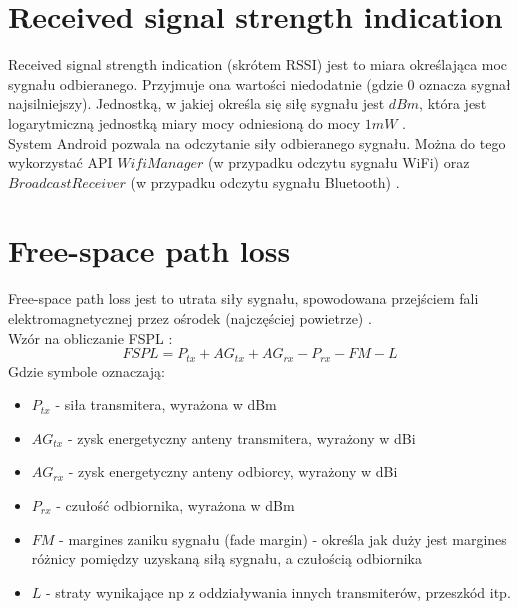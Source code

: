 \section{Received signal strength indication}
Received signal strength indication (skrótem RSSI) jest to miara określająca moc sygnału odbieranego. Przyjmuje ona wartości niedodatnie (gdzie 0 oznacza sygnał najsilniejszy). Jednostką, w jakiej określa się siłę sygnału jest $dBm$, która jest logarytmiczną jednostką miary mocy odniesioną do mocy $1mW$ \cite{AMMC}.\\
System Android pozwala na odczytanie siły odbieranego sygnału. Można do tego wykorzystać API $WifiManager$ (w przypadku odczytu sygnału WiFi) oraz $BroadcastReceiver$ (w przypadku odczytu sygnału Bluetooth) \cite{ADBR}.
\section{Free-space path loss}		  		  
Free-space path loss jest to utrata siły sygnału, spowodowana przejściem fali elektromagnetycznej przez ośrodek (najczęściej powietrze) \cite{SPPLM}.\\
Wzór na obliczanie FSPL \cite{TPL}:
\begin{equation}
FSPL = P_{tx} + AG_{tx} + AG_{rx} - P_{rx} - FM - L
\end{equation}
Gdzie symbole oznaczają:
\begin{itemize}
	\item $P_{tx}$ - siła transmitera, wyrażona w dBm
	\item $AG_{tx}$ - zysk energetyczny anteny transmitera, wyrażony w dBi
	\item $AG_{rx}$ - zysk energetyczny anteny odbiorcy, wyrażony w dBi
	\item $P_{rx}$ - czułość odbiornika, wyrażona w dBm
	\item $FM$ - margines zaniku sygnału (fade margin) - określa jak duży jest margines różnicy pomiędzy uzyskaną siłą sygnału, a czułością odbiornika
	\item $L$ - straty wynikające np z oddziaływania innych transmiterów, przeszkód itp.
\end{itemize}
